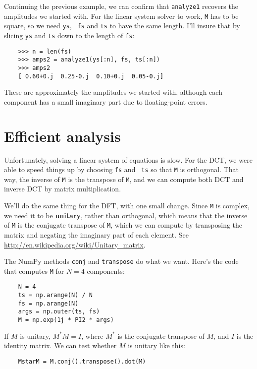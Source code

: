 Continuing the previous example, we can confirm that {\tt analyze1}
recovers the amplitudes we started with.  For the linear system
solver to work, {\tt M} has to be square, so we need {\tt ys}, {\tt
	fs} and {\tt ts} to have the same length.  I'll insure that by
slicing {\tt ys} and {\tt ts} down to the length of {\tt fs}:

\begin{verbatim}
	>>> n = len(fs)
	>>> amps2 = analyze1(ys[:n], fs, ts[:n])
	>>> amps2
	[ 0.60+0.j  0.25-0.j  0.10+0.j  0.05-0.j]
\end{verbatim}

These are approximately the amplitudes we started with, although
each component has a small imaginary part due to
floating-point errors.


\section{Efficient analysis}

Unfortunately, solving a linear system of equations is slow.  For the
DCT, we were able to speed things up by choosing {\tt fs} and {\tt
	ts} so that {\tt M} is orthogonal.  That way, the inverse of {\tt M}
is the transpose of {\tt M}, and we can compute both DCT and inverse
DCT by matrix multiplication.

We'll do the same thing for the DFT, with one small change.
Since {\tt M} is complex, we need it to be {\bf unitary}, rather
than orthogonal, which means that the inverse of {\tt M} is
the conjugate transpose of {\tt M}, which we can compute by
transposing the matrix and negating the imaginary part of each
element.  See \url{http://en.wikipedia.org/wiki/Unitary_matrix}.

The NumPy methods {\tt conj} and {\tt transpose} do what we
want.  Here's the code that computes {\tt M} for $N=4$ components:

\begin{verbatim}
	N = 4
	ts = np.arange(N) / N
	fs = np.arange(N)
	args = np.outer(ts, fs)
	M = np.exp(1j * PI2 * args)
\end{verbatim}

If $M$ is unitary, $M^*M = I$, where $M^*$ is the conjugate transpose
of $M$, and $I$ is the identity matrix.  We can test whether $M$
is unitary like this:

\begin{verbatim}
	MstarM = M.conj().transpose().dot(M)
\end{verbatim}

